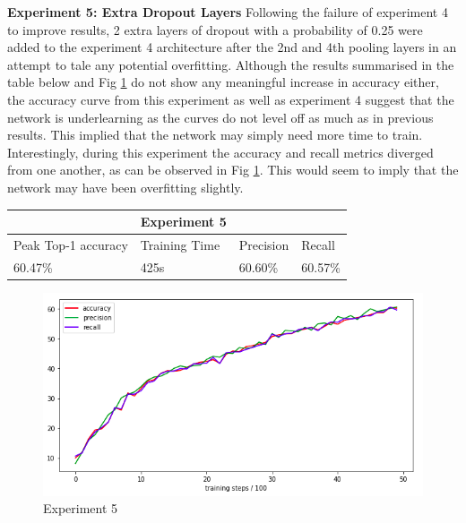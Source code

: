 \documentclass[12pt]{report}
\begin{document}
\newpage
\begin{flushleft}
\vspace{0.5cm}
\textbf{Experiment 5: Extra Dropout Layers}
\linebreak
Following the failure of experiment 4 to improve results, 2 extra layers of dropout with a probability of 0.25 were added to the experiment 4 architecture after the 2nd and 4th pooling layers in an attempt to tale any potential overfitting. Although the results summarised in the table below and Fig \ref{fig:experiment-5} do not show any meaningful increase in accuracy either, the accuracy curve from this experiment as well as experiment 4 suggest that the network is underlearning as the curves do not level off as much as in previous results. This implied that the network may simply need more time to train. Interestingly, during this experiment the accuracy and recall metrics diverged from one another, as can be observed in Fig \ref{fig:experiment-5}. This would seem to imply that the network may have been overfitting slightly.

\vspace{0.5cm}
\begin{tabular}{llll}
                                          & \multicolumn{1}{c}{Experiment 5}   &                                &                              \\ \hline
\multicolumn{1}{|l|}{Peak Top-1 accuracy} & \multicolumn{1}{l|}{Training Time} & \multicolumn{1}{l|}{Precision} & \multicolumn{1}{l|}{Recall}  \\ \hline
\multicolumn{1}{|l|}{60.47\%}             & \multicolumn{1}{l|}{425s}          & \multicolumn{1}{l|}{60.60\%}   & \multicolumn{1}{l|}{60.57\%} \\ \hline
\end{tabular}

\vspace{0.5cm}
\begin{figure}[h]
	\centering
	\includegraphics[width=12cm]{experiment-5}
	\caption{Experiment 5}
	\label{fig:experiment-5}
\end{figure}
\end{flushleft}
\end{document}
